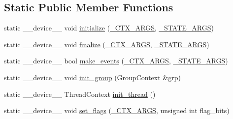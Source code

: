\subsection*{Static Public Member Functions}
\begin{DoxyCompactItemize}
\item 
static \-\_\-\-\_\-device\-\_\-\-\_\- void \hyperlink{structEventProgram_3_01PromiseUnion_3_01FN__IDS_8_8_8_4_00	PROGRAM__STATE_00	ADR__TYPE_00	GROUP__SIZE_01_4_a2944f5f0c7ce4e77bf64153d5cb4494a}{initialize} (\hyperlink{harmonize_8cpp_af53c5ff5aaad0ae06e6d57824cf1611f}{\-\_\-\-C\-T\-X\-\_\-\-A\-R\-G\-S}, \hyperlink{harmonize_8cpp_a2b7c20438ea976a9e5d4c642b8df4d72}{\-\_\-\-S\-T\-A\-T\-E\-\_\-\-A\-R\-G\-S})
\item 
static \-\_\-\-\_\-device\-\_\-\-\_\- void \hyperlink{structEventProgram_3_01PromiseUnion_3_01FN__IDS_8_8_8_4_00	PROGRAM__STATE_00	ADR__TYPE_00	GROUP__SIZE_01_4_ac7f1525333830588fca420d41409c886}{finalize} (\hyperlink{harmonize_8cpp_af53c5ff5aaad0ae06e6d57824cf1611f}{\-\_\-\-C\-T\-X\-\_\-\-A\-R\-G\-S}, \hyperlink{harmonize_8cpp_a2b7c20438ea976a9e5d4c642b8df4d72}{\-\_\-\-S\-T\-A\-T\-E\-\_\-\-A\-R\-G\-S})
\item 
static \-\_\-\-\_\-device\-\_\-\-\_\- bool \hyperlink{structEventProgram_3_01PromiseUnion_3_01FN__IDS_8_8_8_4_00	PROGRAM__STATE_00	ADR__TYPE_00	GROUP__SIZE_01_4_a8b3510ce0c16123e3389f21a7445e798}{make\-\_\-events} (\hyperlink{harmonize_8cpp_af53c5ff5aaad0ae06e6d57824cf1611f}{\-\_\-\-C\-T\-X\-\_\-\-A\-R\-G\-S}, \hyperlink{harmonize_8cpp_a2b7c20438ea976a9e5d4c642b8df4d72}{\-\_\-\-S\-T\-A\-T\-E\-\_\-\-A\-R\-G\-S})
\item 
static \-\_\-\-\_\-device\-\_\-\-\_\- void \hyperlink{structEventProgram_3_01PromiseUnion_3_01FN__IDS_8_8_8_4_00	PROGRAM__STATE_00	ADR__TYPE_00	GROUP__SIZE_01_4_a13ff5778c3be5135ecdbedf445dabd1f}{init\-\_\-group} (Group\-Context \&grp)
\item 
static \-\_\-\-\_\-device\-\_\-\-\_\- Thread\-Context \hyperlink{structEventProgram_3_01PromiseUnion_3_01FN__IDS_8_8_8_4_00	PROGRAM__STATE_00	ADR__TYPE_00	GROUP__SIZE_01_4_a220991bd214c429906ce33c61835c341}{init\-\_\-thread} ()
\item 
static \-\_\-\-\_\-device\-\_\-\-\_\- void \hyperlink{structEventProgram_3_01PromiseUnion_3_01FN__IDS_8_8_8_4_00	PROGRAM__STATE_00	ADR__TYPE_00	GROUP__SIZE_01_4_a194c21836a0c6d87fd82ab8bb145c024}{set\-\_\-flags} (\hyperlink{harmonize_8cpp_af53c5ff5aaad0ae06e6d57824cf1611f}{\-\_\-\-C\-T\-X\-\_\-\-A\-R\-G\-S}, unsigned int flag\-\_\-bits)
\item 

\end{DoxyCompactItemize}
